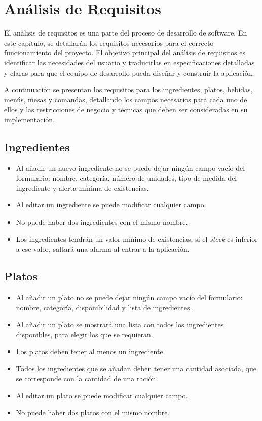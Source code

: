\chapter{Análisis de Requisitos}
\label{cap:AnalisisDeRequisitos}

El análisis de requisitos es una parte del proceso de desarrollo de software. En este capítulo, se detallarán los requisitos necesarios para el correcto funcionamiento del proyecto. El objetivo principal del análisis de requisitos es identificar las necesidades del usuario y traducirlas en especificaciones detalladas y claras para que el equipo de desarrollo pueda diseñar y construir la aplicación.

 A continuación se presentan los requisitos para los ingredientes, platos, bebidas, menús, mesas y comandas, detallando los campos necesarios para cada uno de ellos y las restricciones de negocio y técnicas que deben ser consideradas en su implementación.

\section{Ingredientes}

\begin{itemize}
\item Al añadir un nuevo ingrediente no se puede dejar ningún campo vacío del formulario: nombre, categoría, número de unidades, tipo de medida del ingrediente y alerta mínima de existencias.
\item Al editar un ingrediente se puede modificar cualquier campo.
\item No puede haber dos ingredientes con el mismo nombre.
\item Los ingredientes tendrán un valor mínimo de existencias, si el \textit{stock} es inferior a ese valor, saltará una alarma al entrar a la aplicación.

\end{itemize}

\section{Platos}

\begin{itemize}
\item Al añadir un plato no se puede dejar ningún campo vacío del formulario: nombre, categoría, disponibilidad y lista de ingredientes.
\item Al añadir un plato se mostrará una lista con todos los ingredientes disponibles, para elegir los que se requieran.
\item Los platos deben tener al menos un ingrediente.
\item Todos los ingredientes que se añadan deben tener una cantidad asociada, que se corresponde con la cantidad de una ración.
\item Al editar un plato se puede modificar cualquier campo.
\item No puede haber dos platos con el mismo nombre.

\end{itemize}

